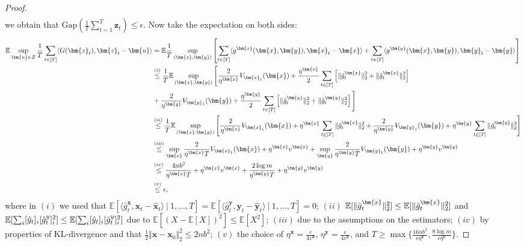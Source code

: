 \documentclass[10pt]{article} %
\def\vu{{\bm{u}}}
\def\vx{{\bm{x}}}
\def\vy{{\bm{y}}}
\def\vz{{\bm{z}}}
\def\evy{{y}}
\newcommand{\E}{\mathbb{E}}
\begin{document}
\begin{proof}
\begin{align*}
        \end{align*}
        we obtain that $\text{Gap}(\frac{1}{T}\sum\limits_{t=1}^T \vz_t) \leq \epsilon$. Now take the expectation on both sides: 
        \begin{align*}
            \E\sup_{\vu\in\mathcal{Z}} \frac{1}{T}\sum\limits_{t\in[T]} \langle G(\vz_t), \vz_t - \vu\rangle &=  \E \frac{1}{T} \sup_{(\vx,\vy)}\left[ \sum\limits_{t\in[T]} \langle g^\vx(\vx,\vy), \vx_t - \vx \rangle + \sum\limits_{t\in[T]} \langle  g^\vy(\vx,\vy), \vy_t - \vy \rangle \right]\\
            &\stackrel{(i)}{\leq} \frac{1}{T} \E \sup_{(\vx,\vy)} \Bigg[ \frac{2}{\eta^\vx}V_{\vx_1}(\vx) + \frac{{\eta^\vx}}{2}\sum\limits_{t\in[T]} \left[ \Vert\Tilde{g}^\vx_t\Vert^2_2 + \Vert\hat{g}^\vx_t\Vert^2_2 \right]\\
            &+ \frac{2}{\eta^\vy}V_{\vy_1}(\vy) + \frac{{\eta^\vy}}{2}\sum\limits_{t\in[T]} \left[ \Vert\Tilde{g}^\vy_t\Vert^2_2 + \Vert\hat{g}^\vy_t\Vert^2_2 \right] \Bigg]\\
            &\stackrel{(ii)}{\leq} \frac{1}{T} \E \sup_{(\vx,\vy)} \Bigg[ \frac{2}{\eta^\vx}V_{\vx_1}(\vx) + \eta^\vx \sum\limits_{t\in[T]}\Vert\Tilde{g}^\vx_t\Vert^2_2 + \frac{2}{\eta^\vy}V_{\vy_1}(\vy) + \eta^\vy \sum\limits_{t\in[T]} \Vert\Tilde{g}^\vy_t\Vert^2_2 \Bigg]\\
            &\stackrel{(iii)}{\leq}  \sup_{\vx}\frac{2}{\eta^\vx T}V_{\vx_1}(\vx) + \eta^\vx v^\vx + \sup_{\vy}\frac{2}{\eta^\vy T}V_{\vy_1}(\vy) + \eta^\vy v^\vy\\
            &\stackrel{(iv)}{\leq}  \frac{4nb^2}{\eta^\vx T} + \eta^\vx v^\vx + \frac{2\log m}{\eta^\vy T} + \eta^\vy v^\vy\\
            &\stackrel{(v)}{\leq}  \epsilon,
        \end{align*}
        where in $(i)$ we used that $\E[\langle \hat{g}^\vx_t, \vx_t - \hat{\vx}_t \rangle \: | \: 1,...,T] = \E[\langle \hat{g}^\vy_t, \vy_t - \hat{\vy}_t \rangle \: | \: 1,...,T] = 0$; $(ii)$ $\E[\Vert \hat{g}^\vx_t \Vert^2_2] \leq \E[\Vert \Tilde{g}^\vx_t \Vert^2_2]$ and $\E[ \sum_i [\hat{\evy}_t]_i  [\hat{g}^\evy_t]^2_i] \leq \E[ \sum_i [\hat{\evy}_t]_i  [\Tilde{g}^\evy_t]^2_i]$ due to $\E[(X-\E[X])^2] \leq \E[X^2]$; $(iii)$ due to the assumptions on the estimators; $(iv)$ by properties of KL-divergence and that $\frac{1}{2}\Vert\vx-\vx_0\Vert^2_2 \leq 2nb^2$; $(v)$ the choice of $\eta^\vx = \frac{\epsilon}{4v^\vx}$, $\eta^\vy = \frac{\epsilon}{4v^\vy}$, and $T \geq \max\{\frac{16nb^2}{\epsilon\eta^\vx}, \frac{8\log m}{\epsilon\eta^\vy}\}$.
\end{proof}
\end{document}
